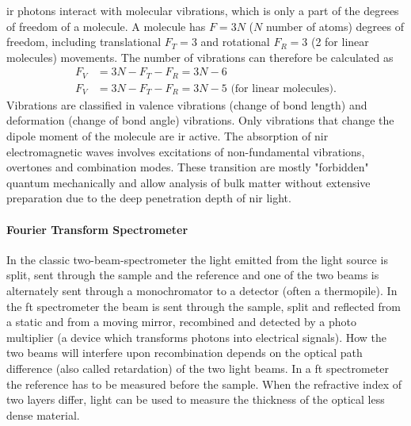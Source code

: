 \Gls{ir} photons interact with molecular vibrations, which is only a part of the degrees of freedom of a molecule.
A molecule has $F=3N$ ($N$ number of atoms) degrees of freedom, including translational $F_T=3$ and rotational $F_R=3$ (2 for linear molecules) movements. 
%
The number of vibrations can therefore be calculated as 
\begin{align*}
	F_V &= 3N - F_T - F_R = 3N - 6 \\
	F_V &= 3N - F_T - F_R = 3N - 5 \textrm{ (for linear molecules)}.
\end{align*}
Vibrations are classified in valence vibrations (change of bond length) and deformation (change of bond angle) vibrations\cite{Melker2006}. 
Only vibrations that change the dipole moment of the molecule are \gls{ir} active. 
The absorption of \Gls{nir} electromagnetic waves involves excitations of non-fundamental vibrations, overtones and combination modes. 
These transition are mostly "forbidden" quantum mechanically and allow analysis of bulk matter without extensive preparation
due to the deep penetration depth of \gls{nir} light\cite{bec2019breakthrough}.


\paragraph{Fourier Transform Spectrometer}
In the classic two-beam-spectrometer the light emitted from the light source is split, 
sent through the sample and the reference and one of the two beams is alternately 
sent through a monochromator to a detector (often a thermopile).
%
In the \gls{ft} spectrometer the beam is sent through the sample, split and 
reflected from a static and from a moving mirror, recombined and detected by a photo 
multiplier (a device which transforms photons into electrical signals). 
How the two beams will interfere upon recombination depends on the optical path difference (also called retardation) of the two light beams\cite{Schwedt2008}.
In a \gls{ft} spectrometer the reference has to be measured before the sample.
%
When the refractive index of two layers differ, light can be used to measure the thickness\cite{Dumin1967} of the optical less dense material.


